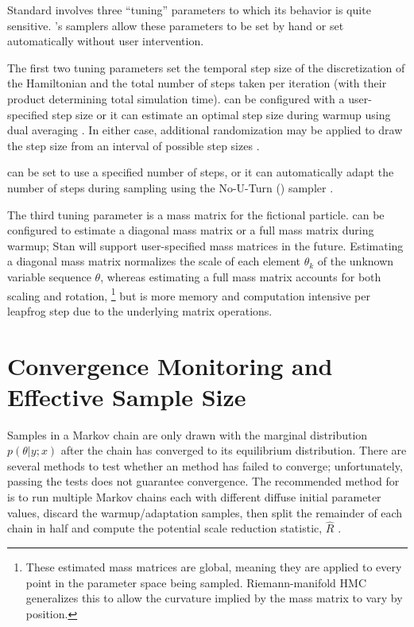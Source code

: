Standard \HMC involves three ``tuning'' parameters to which its
behavior is quite sensitive.  \Stan's samplers allow these parameters
to be set by hand or set automatically without user intervention.

The first two tuning parameters set the temporal step size of the
discretization of the Hamiltonian and the total number of steps taken
per iteration (with their product determining total simulation time).
\Stan can be configured with a user-specified step size or it can
estimate an optimal step size during warmup using dual averaging
\citep{Nesterov:2009, Hoffman-Gelman:2011, Hoffman-Gelman:2013}.  
In either case, additional randomization may be applied to draw the 
step size from an interval of possible step sizes \citep{Neal:2011}.

\Stan can be set to use a specified number of steps, or it can
automatically adapt the number of steps during sampling using the
No-U-Turn (\NUTS) sampler 
\citep{Hoffman-Gelman:2011, Hoffman-Gelman:2013}.  

The third tuning parameter is a mass matrix for the fictional
particle.  \Stan can be configured to estimate a diagonal mass matrix
or a full mass matrix during warmup; Stan will support user-specified
mass matrices in the future.  Estimating a diagonal mass matrix
normalizes the scale of each element $\theta_k$ of the unknown
variable sequence $\theta$, whereas estimating a full mass matrix
accounts for both scaling and rotation,%
%
\footnote{These estimated mass matrices are global, meaning they are
  applied to every point in the parameter space being sampled.
  Riemann-manifold HMC generalizes this to allow the curvature implied
  by the mass matrix to vary by position.}
%
but is more memory and computation intensive per leapfrog step due to
the underlying matrix operations.

\section{Convergence Monitoring and Effective Sample Size}

Samples in a Markov chain are only drawn with the marginal
distribution $p(\theta|y;x)$ after the chain has converged to its
equilibrium distribution.  There are several methods to test whether
an \MCMC method has failed to converge; unfortunately, passing the
tests does not guarantee convergence.  The recommended method for
\Stan is to run multiple Markov chains each with different diffuse
initial parameter values, discard the warmup/adaptation samples, then
split the remainder of each chain in half and compute the potential
scale reduction statistic, $\hat{R}$ \citep{GelmanRubin:1992}.

